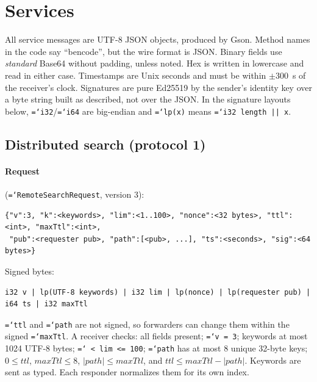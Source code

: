 \documentclass[11pt,a4paper]{article}
\newcommand{\code}[1]{\texttt{\hyphenchar\font=`\-\relax #1}}
\DeclareRobustCommand{\_}{\origunderscore\allowbreak}
\begin{document}
\section{Services}
\label{sec:services}

All service messages are UTF-8 JSON objects, produced by Gson. Method names in the code say
``bencode'', but the wire format is JSON. Binary fields use \emph{standard} Base64 without
padding, unless noted. Hex is written in lowercase and read in either case. Timestamps are
Unix seconds and must be within $\pm 300$~s of the receiver's clock. Signatures are pure
Ed25519 by the sender's identity key over a byte string built as described, not over the
JSON. In the signature layouts below, \code{i32}/\code{i64} are big-endian and
\code{lp(x)} means \code{i32 length || x}.

\subsection{Distributed search (protocol 1)}
\label{sec:search}

\paragraph{Request} (\code{RemoteSearchRequest}, version 3):
\begin{lstlisting}
{"v":3, "k":<keywords>, "lim":<1..100>, "nonce":<32 bytes>, "ttl":<int>, "maxTtl":<int>,
 "pub":<requester pub>, "path":[<pub>, ...], "ts":<seconds>, "sig":<64 bytes>}
\end{lstlisting}
Signed bytes:
\begin{lstlisting}
i32 v | lp(UTF-8 keywords) | i32 lim | lp(nonce) | lp(requester pub) | i64 ts | i32 maxTtl
\end{lstlisting}
\code{ttl} and \code{path} are not signed, so forwarders can change them within the signed
\code{maxTtl}. A receiver checks: all fields present; \code{v = 3}; keywords at most 1024 UTF-8
bytes; \code{0 < lim <= 100}; \code{path} has at most 8 unique 32-byte keys;
$0 \le \mathit{ttl}$, $\mathit{maxTtl} \le 8$, $|\mathit{path}| \le \mathit{maxTtl}$, and
$\mathit{ttl} \le \mathit{maxTtl} - |\mathit{path}|$. Keywords are sent as typed. Each
responder normalizes them for its own index.
\end{document}
